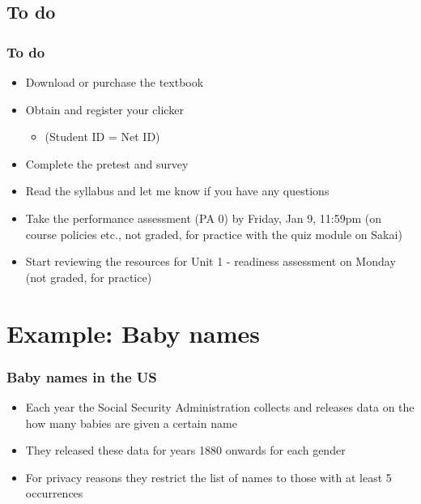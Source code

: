 \documentclass[11pt,containsverbatim,handout,xcolor=xelatex,dvipsnames,table]{beamer}
\begin{document}

\subsection{To do}


\begin{frame}
\frametitle{To do}

\begin{itemize}

\item Download or purchase the textbook

\item Obtain and register your clicker
\begin{itemize}
\item {} (Student ID = Net ID)
\end{itemize}

\item Complete the pretest and survey

\item Read the syllabus and let me know if you have any questions

\item Take the performance assessment (PA 0) by Friday, Jan 9, 11:59pm (on course policies etc., not graded, for practice with the quiz module on Sakai)

\item Start reviewing the resources for Unit 1 - readiness assessment on Monday (not graded, for practice)

\end{itemize}

\end{frame}


\section{Example: Baby names}


\begin{frame}
\frametitle{Baby names in the US}

\begin{itemize}

\item Each year the Social Security Administration collects and releases data on the how many babies are given a certain name

\item They released these data for years 1880 onwards for each gender

\item For privacy reasons they restrict the list of names to those with at least 5 occurrences

\end{itemize}

\end{frame}
\end{document}
